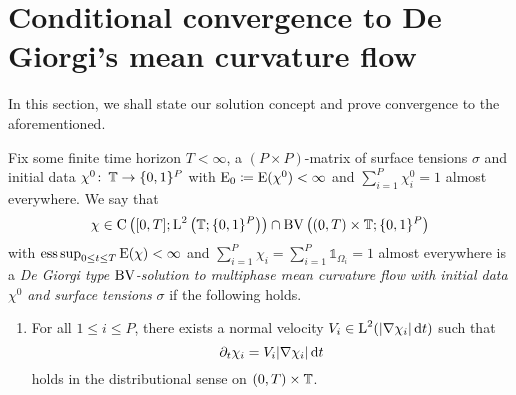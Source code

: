 \section{Conditional convergence to De Giorgi's mean curvature flow}

In this section, we shall state our solution concept and prove convergence to 
the aforementioned.

\begin{definition}
	\label{de_giorgi_solution_to_mmcf}
	Fix some finite time horizon $ T < \infty $, a $ (P \times P) $-matrix of 
	surface tensions $ \sigma $ and initial data $ \chi^{ 0 } \colon \operatorname{\mathbb{T}} 
	\to \{ 0 , 1 \}^{ P } $ with $ \operatorname{E}_{ 0 } \coloneqq \operatorname{E} ( \chi^{ 0 } 
	) < \infty $ and 
	$ \sum_{ i = 1 }^{ P } \chi_{ i }^{ 0 } = 1 $ almost everywhere. We say that
	\begin{equation*}
		\chi \in \operatorname{C} \left(
		[ 0 , T ]
		;
		\operatorname{L}^{ 2 } \left( \operatorname{\mathbb{T}} ; \{ 0 , 1 \}^{ P } \right)
		\right)
		\cap 
		\operatorname{BV} \left(
			( 0 , T ) \times \operatorname{\mathbb{T}} ; \{ 0 , 1 \}^{ P } 
		\right)
	\end{equation*}
	with $ \operatorname*{ess\,sup}_{ 0 \leq t \leq T } \operatorname{E} ( \chi ) < \infty  $ and $ 
	\sum_{ i = 1 
	}^{ P } \chi_{ i } = \sum_{ i = 1 }^{ P } \mathds{ 1 }_{ \Omega_{ i } } = 
	1  $ almost everywhere is a \emph{De Giorgi type }$\operatorname{BV}$\emph{-solution to 
	multiphase mean 
	curvature flow with initial data} $ \chi^{ 0 } $ \emph{and surface 
	tensions} $ \sigma $ if the following holds. 
	\begin{enumerate}
		\item 
		For all $ 1 \leq i \leq P $, there exists a normal 
		velocity $ V_{ i } \in \operatorname{L}^{ 2 } ( \abs{ \nabla \chi_{ i } } \dd{ t } 
		) $ 
		such that
		\begin{equation*}
			\partial_{ t } \chi_{ i }
			=
			V_{ i } \abs{ \nabla \chi_{ i } } \dd{ t }
		\end{equation*}
		holds in the distributional sense on $ ( 0 , T ) \times \operatorname{\mathbb{T}} $.
		

\end{enumerate}
\end{definition}
